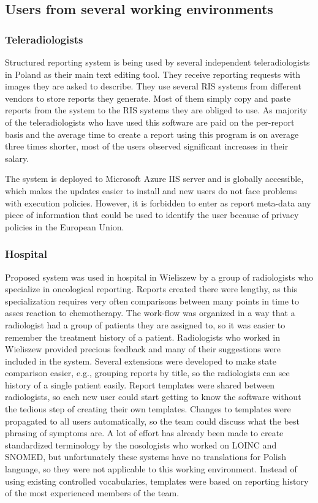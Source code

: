 \documentclass[12pt, twoside, openany]{report}
\theoremstyle{definition}
\begin{document}
\subsection{Users from several working environments}
\subsubsection{Teleradiologists}
Structured reporting system is being used by several independent teleradiologists in Poland as their main text editing tool. They receive reporting requests with images they are asked to describe. They use several RIS systems from different vendors to store reports they generate. Most of them simply copy and paste reports from the system to the RIS systems they are obliged to use. As majority of the teleradiologists who have used this software are paid on the per-report basis and the average time to create a report using this program is on average three times shorter, most of the users observed significant increases in their salary. 

The system is deployed to Microsoft Azure IIS server and is globally accessible, which makes the updates easier to install and new users do not face problems with execution policies. However, it is forbidden to enter as report meta-data any piece of information that could be used to identify the user because of privacy policies in the European Union. 

\subsubsection{Hospital}
Proposed system was used in hospital in Wieliszew by a group of radiologists who specialize in oncological reporting. Reports created there were lengthy, as this specialization requires very often comparisons between many points in time to asses reaction to chemotherapy. The work-flow was organized in a way that a radiologist had a group of patients they are assigned to, so it was easier to remember the treatment history of a patient. Radiologists who worked in Wieliszew provided precious feedback and many of their suggestions were included in the system. Several extensions were developed to make state comparison easier, e.g., grouping reports by title, so the radiologists can see history of a single patient easily. 
Report templates were shared between radiologists, so each new user could start getting to know the software without the tedious step of creating their own templates. Changes to templates were propagated to all users automatically, so the team could discuss what the best phrasing of symptoms are. A lot of effort has already been made to create standardized terminology by the nosologists who worked on LOINC and SNOMED, but unfortunately these systems have no translations for Polish language, so they were not applicable to this working environment. Instead of using existing controlled vocabularies, templates were based on reporting history of the most experienced members of the team.
\end{document}
